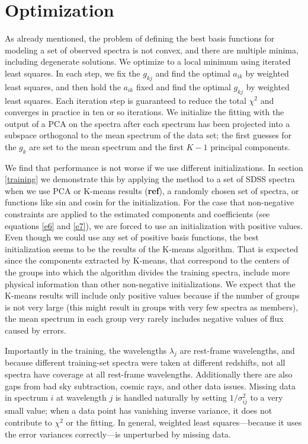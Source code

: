 \documentclass[apj]{emulateapj}
\begin{document}
\section{Optimization}\label{optimization}
As already mentioned, the problem of defining the best basis functions for modeling a set of observed spectra is not convex, and there are multiple minima, including degenerate solutions. We optimize to a local minimum using iterated least squares. In each step, we fix the $g_{kj}$ and find the optimal $a_{ik}$ by weighted least squares, and then hold the $a_{ik}$ fixed and find the optimal $g_{kj}$ by weighted least squares. Each iteration step is guaranteed to reduce the total $\chi^2$ and converges in practice in ten or so iterations. We initialize the fitting with the output of a PCA on the spectra after each spectrum has been projected into a subspace orthogonal to the mean spectrum of the data set; the first guesses for the $g_{k}$ are set to the mean spectrum and the first $K-1$ principal components.

We find that performance is not worse if we use different initializations. In section \ref{training} we demonstrate this by applying the method to a set of SDSS spectra when we use PCA or K-means results (\textbf{ref}), a randomly chosen set of spectra, or functions like sin and cosin for the initialization. For the case that non-negative constraints are applied to the estimated components and coefficients (see equations \ref{e6} and \ref{e7}), we are forced to use an initialization with positive values. Even though we could use any set of positive basis functions, the best initialization seems to be the results of the K-means algorithm. That is expected since the components extracted by K-means, that correspond to the centers of the groups into which the algorithm divides the training spectra, include more physical information than other non-negative initializations. We expect that the K-means results will include only positive values because if the number of groups is not very large (this might result in groups with very few spectra as members), the mean spectrum in each group very rarely includes negative values of flux caused by errors.

Importantly in the training, the wavelengths $\lambda_j$ are rest-frame wavelengths, and because different training-set spectra were taken at different redshifts, not all spectra have coverage at all rest-frame wavelengths. Additionally there are also gaps from bad sky subtraction, cosmic rays, and other data issues.  Missing data in spectrum $i$ at wavelength $j$ is handled naturally by setting
$1/\sigma^2_{ij}$ to a very small value; when a data point has vanishing inverse variance, it does not contribute to $\chi^2$ or the fitting. In general, weighted least squares---because it uses the error variances correctly---is unperturbed by missing data.
\end{document}
